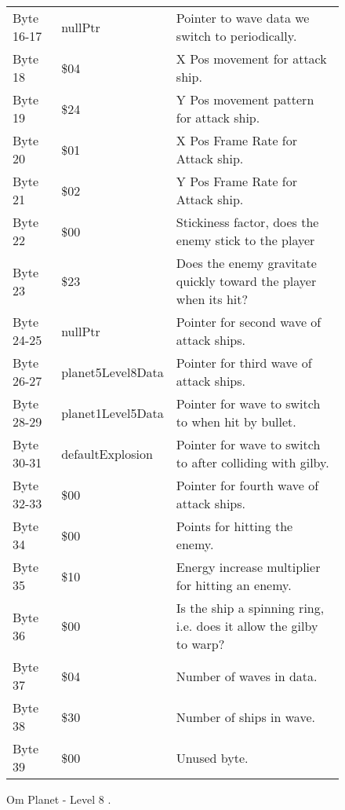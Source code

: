 \begin{figure}[H]
{\begin{adjustbox}{width=12cm}
\begin{tabular}{lll}
 Byte 16-17 & nullPtr           & Pointer to wave data we switch to periodically.                     \\
 Byte 18    & \$04               & X Pos movement for attack ship.                                     \\
 Byte 19    & \$24               & Y Pos movement pattern for attack ship.                             \\
 Byte 20    & \$01               & X Pos Frame Rate for Attack ship.                                   \\
 Byte 21    & \$02               & Y Pos Frame Rate for Attack ship.                                   \\
 Byte 22    & \$00               & Stickiness factor, does the enemy stick to the player               \\
 Byte 23    & \$23               & Does the enemy gravitate quickly toward the player when its hit?    \\
 Byte 24-25 & nullPtr           & Pointer for second wave of attack ships.                            \\
 Byte 26-27 & planet5Level8Data & Pointer for third wave of attack ships.                             \\
 Byte 28-29 & planet1Level5Data & Pointer for wave to switch to when hit by bullet.                   \\
 Byte 30-31 & defaultExplosion  & Pointer for  wave to switch to after colliding with gilby.          \\
 Byte 32-33 & \$00               & Pointer for fourth wave of attack ships.                            \\
 Byte 34    & \$00               & Points for hitting the enemy.                                       \\
 Byte 35    & \$10               & Energy increase multiplier for hitting an enemy.                    \\
 Byte 36    & \$00               & Is the ship a spinning ring, i.e. does it allow the gilby to warp?  \\
 Byte 37    & \$04               & Number of waves in data.                                            \\
 Byte 38    & \$30               & Number of ships in wave.                                            \\
 Byte 39    & \$00               & Unused byte.                                                        \\
\bottomrule
\end{tabular}

  \end{adjustbox}

  }\caption*{Om Planet - Level 8
.}
\end{figure}

